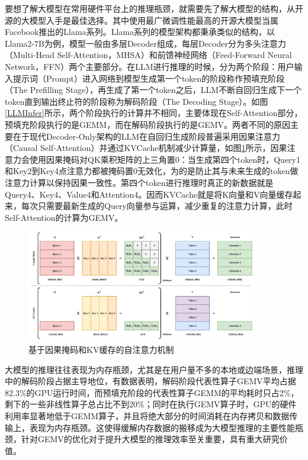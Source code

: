 要想了解大模型在常用硬件平台上的推理瓶颈，就需要先了解大模型的结构，从开源的大模型入手是最佳选择。其中使用最广微调性能最高的开源大模型当属Facebook推出的Llama系列。Llama系列的模型架构都秉承类似的结构，以Llama2-7B\cite{Llama2}为例，模型一般由多层Decoder组成，每层Decoder分为多头注意力（Multi-Head Self-Attention，MHSA）和前馈神经网络（Feed-Forward Neural Network，FFN）两个主要部分。在LLM进行推理的时候，分为两个阶段：用户输入提示词（Prompt）进入网络到模型生成第一个token的阶段称作预填充阶段（The Prefilling Stage），再生成了第一个token之后，LLM不断自回归生成下一个token直到输出终止符的阶段称为解码阶段（The Decoding Stage）。如图\ref{LLMInfer}所示，两个阶段执行的计算并不相同，主要体现在Self-Attention部分，预填充阶段执行的是GEMM，而在解码阶段执行的是GEMV。两者不同的原因主要在于现代Decoder-Only架构的LLM在自回归生成阶段普遍采用因果注意力（Causal Self-Attention）并通过KVCache机制减少计算量，如图\ref{KVCache}所示，因果注意力会使用因果掩码对QK乘积矩阵的上三角置0：当生成第四个token时，Query1和Key2到Key4点注意力都被掩码置0无效化，为的是防止其与未来生成的token做注意力计算以保持因果一致性。第四个token进行推理时真正的新数据就是Query4、Key4、Value4和Attention4。因而KVCache就是将K向量和V向量缓存起来，每次只需要最新生成的Query向量参与运算，减少重复的注意力计算，此时Self-Attention的计算为GEMV。

\begin{figure}[!htbp]
	\centering
    \includegraphics[width=0.9\textwidth]{figures/KVCache.pdf}
    \caption{基于因果掩码和KV缓存的自注意力机制}
	\label{KVCache}
\end{figure}

大模型的推理往往表现为内存瓶颈，尤其是在用户量不多的本地或边端场景，推理中的解码阶段占据主导地位\cite{InferLinear}，有数据表明，解码阶段代表性算子GEMV平均占据82.3\%的GPU运行时间，而预填充阶段的代表性算子GEMM的平均耗时只占2\%，剩下的一些非线性算子总占比不到20\%；同时在执行GEMV算子时，GPU的硬件利用率显著地低于GEMM算子，并且将绝大部分的时间消耗在内存拷贝和数据传输上，表现为内存瓶颈\cite{SamsungHotChips}。这使得缓解内存数据的搬移成为大模型推理的主要性能瓶颈，针对GEMV的优化对于提升大模型的推理效率至关重要，具有重大研究价值。

